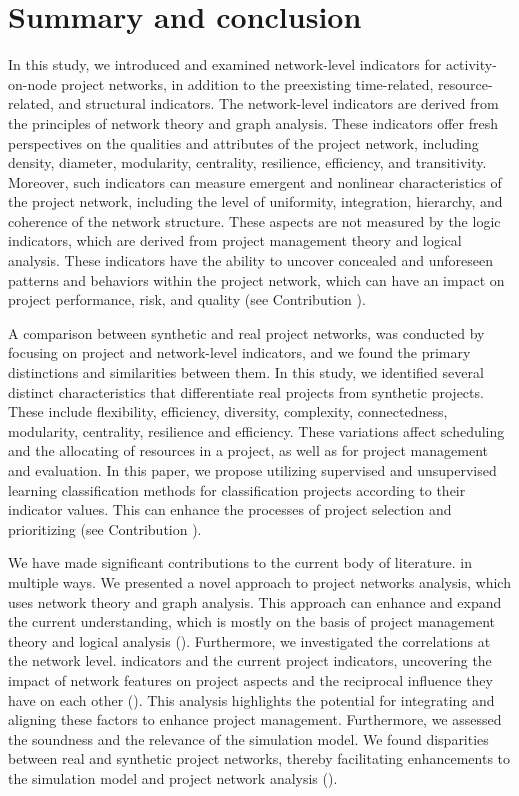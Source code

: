 \documentclass[preprint,
3p]{elsarticle} %
\begin{document}
\section{Summary and conclusion}\label{sec:conclusion}

In this study, we introduced and examined network-level indicators for
activity-on-node project networks, in addition to the preexisting
time-related, resource-related, and structural indicators. The
network-level indicators are derived from the principles of network
theory and graph analysis. These indicators offer fresh perspectives on
the qualities and attributes of the project network, including density,
diameter, modularity, centrality, resilience, efficiency, and
transitivity. Moreover, such indicators can measure emergent and
nonlinear characteristics of the project network, including the level of
uniformity, integration, hierarchy, and coherence of the network
structure. These aspects are not measured by the logic indicators, which
are derived from project management theory and logical analysis. These
indicators have the ability to uncover concealed and unforeseen patterns
and behaviors within the project network, which can have an impact on
project performance, risk, and quality (see Contribution ).

A comparison between synthetic and real project networks, was conducted
by focusing on project and network-level indicators, and we found the
primary distinctions and similarities between them. In this study, we
identified several distinct characteristics that differentiate real
projects from synthetic projects. These include flexibility, efficiency,
diversity, complexity, connectedness, modularity, centrality, resilience
and efficiency. These variations affect scheduling and the allocating of
resources in a project, as well as for project management and
evaluation. In this paper, we propose utilizing supervised and
unsupervised learning classification methods for classification projects
according to their indicator values. This can enhance the processes of
project selection and prioritizing (see Contribution ).

We have made significant contributions to the current body of
literature. in multiple ways. We presented a novel approach to project
networks analysis, which uses network theory and graph analysis. This
approach can enhance and expand the current understanding, which is
mostly on the basis of project management theory and logical analysis
(). Furthermore, we investigated the correlations at the
network level. indicators and the current project indicators, uncovering
the impact of network features on project aspects and the reciprocal
influence they have on each other (). This analysis
highlights the potential for integrating and aligning these factors to
enhance project management. Furthermore, we assessed the soundness and
the relevance of the simulation model. We found disparities between real
and synthetic project networks, thereby facilitating enhancements to the
simulation model and project network analysis ().
\end{document}
